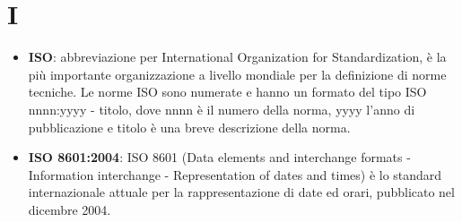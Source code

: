 \section{I}
\begin{itemize} 
	\item
	\textbf{ISO}: abbreviazione per International Organization for Standardization, è la più importante organizzazione a livello mondiale per la definizione di norme tecniche. Le norme ISO sono numerate e hanno un formato del tipo ISO nnnn:yyyy - titolo, dove nnnn è il numero della norma, yyyy l'anno di pubblicazione e titolo è una breve descrizione della norma.
	\item
	\textbf{ISO 8601:2004}: ISO 8601 (Data elements and interchange formats - Information interchange - Representation of dates and times) è lo standard internazionale attuale per la rappresentazione di date ed orari, pubblicato nel dicembre 2004.
\end{itemize}